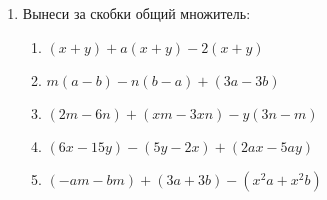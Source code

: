 \documentclass[12pt, a4paper]{article}
\begin{document}
	
 \cfoot{}
\begin{enumerate}
	\item Вынеси за скобки общий множитель:
	\begin{multicols}{2}
		\begin{enumerate}[label=\textbf{\arabic*)}]
			\item $(x+y)+a(x+y)-2(x+y)$
			\item $m(a-b)-n(b-a)+(3a-3b)$
			\item $(2m-6n)+(xm-3xn)-y(3n-m)$
			\item $(6x-15y)-(5y-2x)+(2ax-5ay)$
			\item $(-am-bm)+(3a+3b)-(x^2a+x^2b)$
		\end{enumerate}
	\end{multicols}
\end{enumerate}
\end{document}
